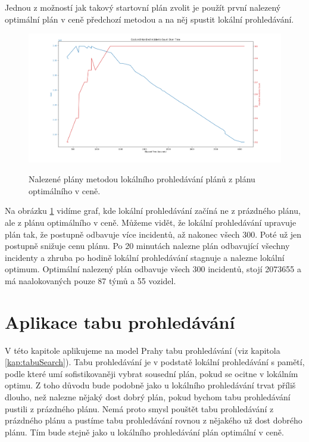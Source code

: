 Jednou z možností jak takový startovní plán zvolit je použít první nalezený optimální plán v ceně předchozí metodou a na něj spustit lokální prohledávání.

\begin{figure}[H]
  \caption{Nalezené plány metodou lokálního prohledávání plánů z plánu optimálního v ceně.}
  \includegraphics[width=\textwidth]{img/hybrid_prague.png}
  \centering
  \label{img:hybrid}
\end{figure}

Na obrázku \ref{img:hybrid} vidíme graf, kde lokální prohledávání začíná ne z prázdného plánu, ale z plánu optimálního v ceně.
Můžeme vidět, že lokální prohledávání upravuje plán tak, že postupně odbavuje více incidentů, až nakonec všech 300. Poté už jen postupně snižuje cenu plánu.
Po 20 minutách nalezne plán odbavující všechny incidenty a zhruba po hodině lokální prohledávání stagnuje a nalezne lokální optimum.
Optimální nalezený plán odbavuje všech 300 incidentů, stojí 2073655 a má naalokovaných pouze 87 týmů a 55 vozidel.

\section{Aplikace tabu prohledávání}

V této kapitole aplikujeme na model Prahy tabu prohledávání (viz kapitola \ref{kap:tabuSearch}).
Tabu prohledávání je v podstatě lokální prohledávání s pamětí, podle které umí sofistikovaněji vybrat sousední plán,
pokud se ocitne v lokálním optimu.
Z toho důvodu bude podobně jako u lokálního prohledávání trvat příliš dlouho, než nalezne nějaký dost dobrý plán, pokud bychom tabu prohledávání pustili z prázdného plánu.
Nemá proto smysl pouštět tabu prohledávání z prázdného plánu a pustíme tabu prohledávání rovnou z nějakého už dost dobrého plánu.
Tím bude stejně jako u lokálního prohledávání plán optimální v ceně.

